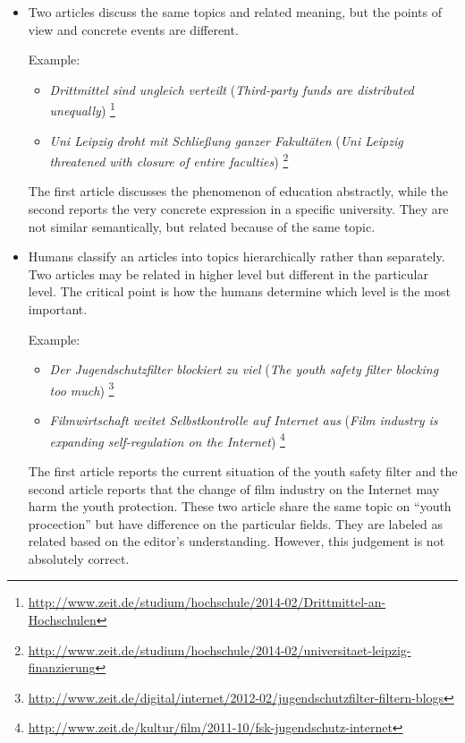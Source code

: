 \begin{itemize}
    \item Two articles discuss the same topics and related meaning, but the points of view and concrete events are different. 
    
    Example:
    \begin{itemize}
    \item \textit{Drittmittel sind ungleich verteilt} (\textit{Third-party funds are distributed unequally}) \footnote{\url{http://www.zeit.de/studium/hochschule/2014-02/Drittmittel-an-Hochschulen}}
    \item \textit{Uni Leipzig droht mit Schlie\ss{}ung ganzer Fakult\"aten} (\textit{Uni Leipzig threatened with closure of entire faculties}) \footnote{\url{http://www.zeit.de/studium/hochschule/2014-02/universitaet-leipzig-finanzierung}}
    \end{itemize}
    The first article discusses the phenomenon of education abstractly, while the second reports the very concrete expression in a specific university. They are not similar semantically, but related because of the same topic.
    
    
    \item Humans classify an articles into topics hierarchically rather than separately. Two articles may be related in higher level but different in the particular level. The critical point is how the humans determine which level is the most important. 
    
    Example:
    \begin{itemize}
        \item \textit{Der Jugendschutzfilter blockiert zu viel} (\textit{The youth safety filter blocking too much}) \footnote{\url{http://www.zeit.de/digital/internet/2012-02/jugendschutzfilter-filtern-blogs}}
        \item \textit{Filmwirtschaft weitet Selbstkontrolle auf Internet aus} (\textit{Film industry is expanding self-regulation on the Internet}) \footnote{\url{http://www.zeit.de/kultur/film/2011-10/fsk-jugendschutz-internet}}
    \end{itemize}    
    
    The first article reports the current situation of the youth safety filter and the second article reports that the change of film industry on the Internet may harm the youth protection. These two article share the same topic on ``youth procection'' but have difference on the particular fields. They are labeled as related based on the editor's understanding. However, this judgement is not absolutely correct. 
    
\end{itemize}
